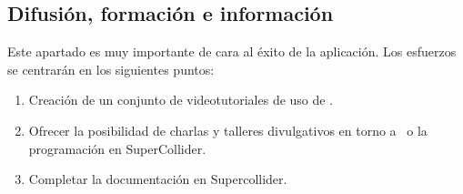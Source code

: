 \subsection{Difusión, formación e información}

Este apartado es muy importante de cara al éxito de la aplicación. Los esfuerzos se centrarán en los siguientes puntos:

\begin{enumerate}
	\item Creación de un conjunto de videotutoriales de uso de \appName.
	\item Ofrecer la posibilidad de charlas y talleres divulgativos en torno a \appName~o la programación en SuperCollider.
	\item Completar la documentación en Supercollider.
\end{enumerate}

